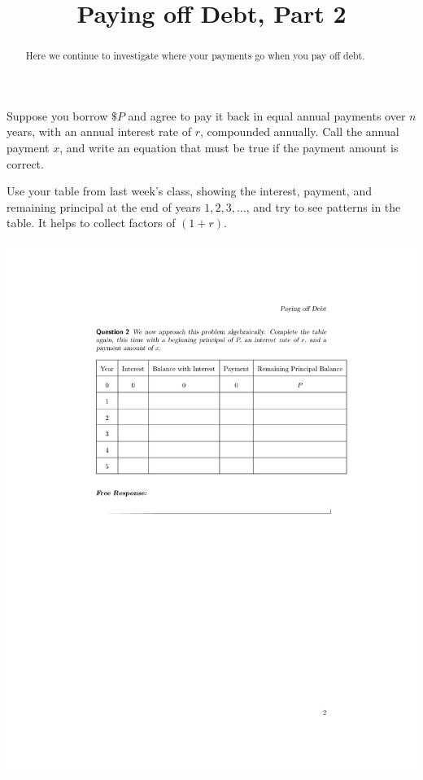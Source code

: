 \documentclass[handout,space,nooutcomes]{ximera}
\title{Paying off Debt, Part 2}
\begin{document}
\begin{abstract}
Here we continue to investigate where your payments go when you pay off debt.
\end{abstract}
\maketitle


\begin{question}
Suppose you borrow $\$P$ and agree to pay it back in equal annual
payments over $n$ years, with an annual interest rate of $r$, compounded annually.  
Call the annual payment $x$, and write an equation that must be true if
the payment amount is correct.  

\begin{hint}
Use your table from last week's class, showing the interest, payment, and remaining
principal at the end of years $1, 2, 3, \dots$, and try to see
patterns in the table.  It helps to collect factors of $(1+r)$.
\end{hint} 
\includegraphics[scale=1.2]{payingOffDebtTableGraphic2.pdf}

\begin{freeResponse}
\end{freeResponse}
\end{question}
\end{document}
